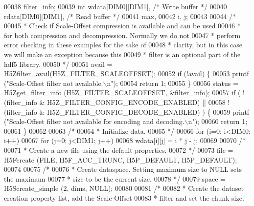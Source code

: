\begin{DoxyCode}
00038                     filter\_info;
00039     \textcolor{keywordtype}{int}             wdata[DIM0][DIM1],          \textcolor{comment}{/* Write buffer */}
00040                     rdata[DIM0][DIM1],          \textcolor{comment}{/* Read buffer */}
00041                     max,
00042                     i, j;
00043 
00044     \textcolor{comment}{/*}
00045 \textcolor{comment}{     * Check if Scale-Offset compression is available and can be used}
00046 \textcolor{comment}{     * for both compression and decompression.  Normally we do not}
00047 \textcolor{comment}{     * perform error checking in these examples for the sake of}
00048 \textcolor{comment}{     * clarity, but in this case we will make an exception because this}
00049 \textcolor{comment}{     * filter is an optional part of the hdf5 library.}
00050 \textcolor{comment}{     */}
00051     avail = H5Zfilter\_avail(H5Z\_FILTER\_SCALEOFFSET);
00052     \textcolor{keywordflow}{if} (!avail) \{
00053         printf (\textcolor{stringliteral}{"Scale-Offset filter not available.\(\backslash\)n"});
00054         \textcolor{keywordflow}{return} 1;
00055     \}
00056     status = H5Zget\_filter\_info (H5Z\_FILTER\_SCALEOFFSET, &filter\_info);
00057     \textcolor{keywordflow}{if} ( !(filter\_info & H5Z\_FILTER\_CONFIG\_ENCODE\_ENABLED) ||
00058                 !(filter\_info & H5Z\_FILTER\_CONFIG\_DECODE\_ENABLED) ) \{
00059         printf (\textcolor{stringliteral}{"Scale-Offset filter not available for encoding and decoding.\(\backslash\)n"});
00060         \textcolor{keywordflow}{return} 1;
00061     \}
00062 
00063     \textcolor{comment}{/*}
00064 \textcolor{comment}{     * Initialize data.}
00065 \textcolor{comment}{     */}
00066     \textcolor{keywordflow}{for} (i=0; i<DIM0; i++)
00067         \textcolor{keywordflow}{for} (j=0; j<DIM1; j++)
00068             wdata[i][j] = i * j - j;
00069 
00070     \textcolor{comment}{/*}
00071 \textcolor{comment}{     * Create a new file using the default properties.}
00072 \textcolor{comment}{     */}
00073     file = H5Fcreate (FILE, H5F\_ACC\_TRUNC, H5P\_DEFAULT, H5P\_DEFAULT);
00074 
00075     \textcolor{comment}{/*}
00076 \textcolor{comment}{     * Create dataspace.  Setting maximum size to NULL sets the maximum}
00077 \textcolor{comment}{     * size to be the current size.}
00078 \textcolor{comment}{     */}
00079     space = H5Screate\_simple (2, dims, NULL);
00080 
00081     \textcolor{comment}{/*}
00082 \textcolor{comment}{     * Create the dataset creation property list, add the Scale-Offset}
00083 \textcolor{comment}{     * filter and set the chunk size.}

\end{DoxyCode}
